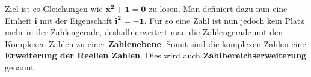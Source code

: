 \parbox{0.9\textwidth}{
    Ziel ist es Gleichungen wie $\mathbf{x^2 + 1 = 0}$ zu lösen.
    Man definiert dazu nun eine Einheit $\mathbf{i}$ mit der Eigenschaft $\mathbf{i^2 = -1}$.
    Für so eine Zahl ist nun jedoch kein Platz mehr in der Zahlengerade, 
    deshalb erweitert man die Zahlengerade mit den Komplexen Zahlen zu einer \textbf{Zahlenebene}.
    Somit sind die komplexen Zahlen eine \textbf{Erweiterung der Reellen Zahlen}.
    Dies wird auch \textbf{Zahlbereichserweiterung} genannt
} 